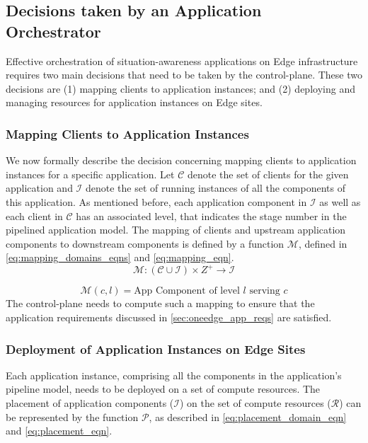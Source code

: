 \subsection{Decisions taken by an Application Orchestrator}
\label{sec:app_orch_decisions}
Effective orchestration of situation-awareness applications on Edge infrastructure requires two main decisions that need to be taken by the control-plane. These two decisions are (1) mapping clients to application instances; and (2) deploying and managing resources for application instances on Edge sites.

\subsubsection{Mapping Clients to Application Instances}
\newcommand{\clientset}{\mathcal{C}}
\newcommand{\instanceset}{\mathcal{I}}
\newcommand{\resourceset}{\mathcal{R}}

We now formally describe the decision concerning mapping clients to application instances for a specific application. Let $\clientset$ denote the set of clients for the given application and $\instanceset$ denote the set of running instances of all the components of this application. As mentioned before, each application component in $\instanceset$ as well as each client in $\clientset$ has an associated level, that indicates the stage number in the pipelined application model. The mapping of clients and upstream application components to downstream components is defined by a function $\mathcal{M}$, defined in \cref{eq:mapping_domains_eqns} and \cref{eq:mapping_eqn}.
\begin{equation}
\label{eq:mapping_domains_eqns}
\mathcal{M} : \left( \clientset \cup \instanceset \right) \times Z^+ \rightarrow \instanceset
\end{equation}

\begin{equation}
\label{eq:mapping_eqn}
\mathcal{M} \left( c, l \right) = \text{App Component of level }l \text{ serving }c
\end{equation}
The control-plane needs to compute such a mapping to ensure that the application requirements discussed in \cref{sec:oneedge_app_reqs} are satisfied.

\subsubsection{Deployment of Application Instances on Edge Sites}
Each application instance, comprising all the components in the application's pipeline model, needs to be deployed on a set of compute resources. The placement of application components ($\instanceset$) on the set of compute resources ($\resourceset$) can be represented by the function $\mathcal{P}$, as described in \cref{eq:placement_domain_eqn} and \cref{eq:placement_eqn}.

